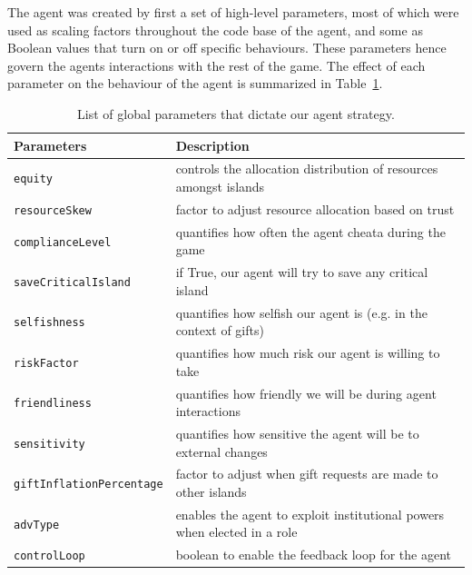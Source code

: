The agent was created by first a set of high-level parameters, most of which were used as scaling factors throughout the code base of the agent, and some as Boolean values that turn on or off specific behaviours. These parameters hence govern the agents interactions with the rest of the game. The effect of each parameter on the behaviour of the agent is summarized in Table~\ref{tab:team3:parameter_effects}. \\


\begin{center}
    
\begin{table}[H]
\centering
\begin{tabular}{l|l}
\textbf{Parameters} & \textbf{Description}  \\ 
\hline
\texttt{equity}                       & controls the allocation distribution of resources amongst islands              \\ \hdashline
\texttt{resourceSkew}                 & factor to adjust resource allocation based on trust             \\ \hdashline
\texttt{complianceLevel}              & quantifies how often the agent cheata during the game             \\ \hdashline
\texttt{saveCriticalIsland}           & if True, our agent will try to save any critical island             \\ \hdashline
\texttt{selfishness}                  & quantifies how selfish our agent is (e.g. in the context of gifts)             \\ \hdashline
\texttt{riskFactor}                   & quantifies how much risk our agent is willing to take        \\ \hdashline
\texttt{friendliness}                 & quantifies how friendly we will be during agent interactions            \\ \hdashline
\texttt{sensitivity}                  & quantifies how sensitive the agent will be to external changes            \\ \hdashline
\texttt{giftInflationPercentage}      & factor to adjust when gift requests are made to other islands             \\ \hdashline
\texttt{advType}                      & enables the agent to exploit institutional powers when elected in a role    \\ \hdashline
\texttt{controlLoop}                  & boolean to enable the feedback loop for the agent       
\end{tabular}
\caption{List of global parameters that dictate our agent strategy.}
\label{tab:team3:parameter_effects}
\end{table}
\end{center}

